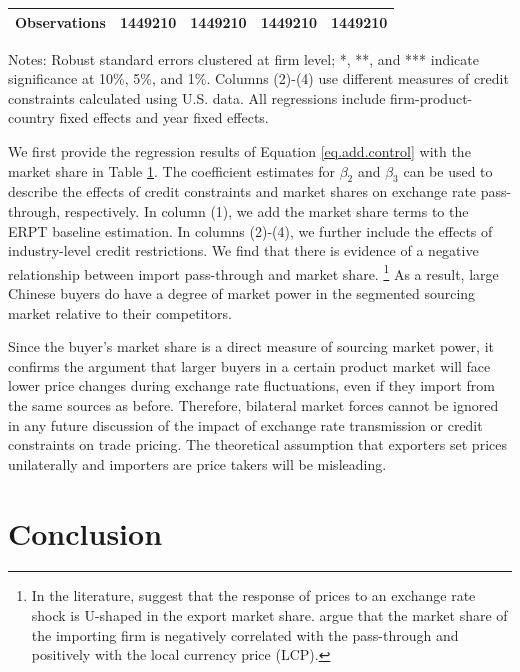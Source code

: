 \documentclass[12pt]{article}
\begin{document}
\begin{table}[htb]
\begin{threeparttable}
\begin{tabular}{lcccc}
			Observations & 1449210  & 1449210 & 1449210 & 1449210 \\
			\bottomrule
		\end{tabular}
		\begin{tablenotes}
			\footnotesize
			\item[Notes:] Robust standard errors clustered at firm level; *, **, and *** indicate significance at 10\%, 5\%, and 1\%. Columns (2)-(4) use different measures of credit constraints calculated using U.S. data. All regressions include firm-product-country fixed effects and year fixed effects.
		\end{tablenotes}
	\end{threeparttable}
	\label{tab.share}
\end{table}

We first provide the regression results of Equation \ref{eq.add.control} with the market share in Table \ref{tab.share}. The coefficient estimates for $\beta_2$ and $\beta_3$ can be used to describe the effects of credit constraints and market shares on exchange rate pass-through, respectively. In column (1), we add the market share terms to the ERPT baseline estimation. In columns (2)-(4), we further include the effects of industry-level credit restrictions. We find that there is evidence of a negative relationship between import pass-through and market share. \footnote{In the literature, \cite{auer2016} suggest that the response of prices to an exchange rate shock is U-shaped in the export market share. \cite{devereux2017} argue that the market share of the importing firm is negatively correlated with the pass-through and positively with the local currency price (LCP).} As a result, large Chinese buyers do have a degree of market power in the segmented sourcing market relative to their competitors.

Since the buyer's market share is a direct measure of sourcing market power, it confirms the argument that larger buyers in a certain product market will face lower price changes during exchange rate fluctuations, even if they import from the same sources as before. Therefore, bilateral market forces cannot be ignored in any future discussion of the impact of exchange rate transmission or credit constraints on trade pricing. The theoretical assumption that exporters set prices unilaterally and importers are price takers will be misleading.

\section{Conclusion}\label{Conclusion}
\end{document}
